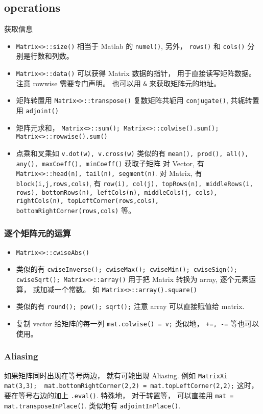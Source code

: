 \subsection{operations}
获取信息
\begin{itemize}
\item \verb|Matrix<>::size()| 相当于 Matlab 的 \verb|numel()|, 另外， \verb|rows()| 和 \verb|cols()| 分别是行数和列数。
\item \verb|Matrix<>::data()| 可以获得 Matrix 数据的指针， 用于直接读写矩阵数据。 注意 rowwise 需要专门声明。 也可以用 \verb|&| 来获取矩阵元的地址。
\item 矩阵转置用 \verb|Matrix<>::transpose()| 复数矩阵共轭用 \verb|conjugate()|, 共轭转置用 \verb|adjoint()|
\item 矩阵元求和， \verb|Matrix<>::sum(); Matrix<>::colwise().sum(); Matrix<>::rowwise().sum()|
\item 点乘和叉乘如 \verb|v.dot(w), v.cross(w)|
类似的有 \verb|mean(), prod(), all(), any(), maxCoeff(), minCoeff()|
获取子矩阵
对 Vector, 有 \verb|Matrix<>::head(n), tail(n), segment(n)|. 对 Matrix, 有 \verb|block(i,j,rows,cols)|, 有 \verb|row(i), col(j), topRows(n), middleRows(i, rows), bottomRows(n), leftCols(n), middleCols(j, cols), rightCols(n), topLeftCorner(rows,cols), bottomRightCorner(rows,cols)| 等。
\end{itemize}


\subsubsection{逐个矩阵元的运算}
\begin{itemize}
\item \verb|Matrix<>::cwiseAbs()|
\item 类似的有 \verb|cwiseInverse(); cwiseMax(); cwiseMin(); cwiseSign(); cwiseSqrt(); Matrix<>::array()| 用于把 Matrix 转换为 array, 逐个元素运算， 或加减一个常数。 如 \verb|Matrix<>::array().square()|
\item 类似的有 \verb|round(); pow(); sqrt();| 注意 array 可以直接赋值给 matrix.
\item 复制 vector 给矩阵的每一列 \verb|mat.colwise() = v;| 类似地， \verb|+=, -=| 等也可以使用。
\end{itemize}


\subsubsection{Aliasing}
如果矩阵同时出现在等号两边， 就有可能出现 Aliasing. 例如 \verb|MatrixXi mat(3,3);  mat.bottomRightCorner(2,2) = mat.topLeftCorner(2,2);| 这时， 要在等号右边的加上 \verb|.eval()|. 特殊地， 对于转置等， 可以直接用 \verb|mat = mat.transposeInPlace()|. 类似地有 \verb|adjointInPlace()|.

